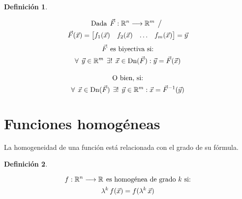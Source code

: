 \documentclass[a5paper,12pt,twoside]{book}
\newtheorem{defn}{{Definición}}[chapter]
\begin{document}
\begin{mdframed}[style=DefinitionFrame]
    \begin{defn}
    \end{defn}
    \begin{multline*}
        \textrm{Dada} \hspace{1ex} \Vec{F}: \mathbb{R}^n \longrightarrow \mathbb{R}^m \hspace{1ex} \big/ \hspace{1ex}
        \\
        \Vec{F}(\Vec{x}) = \begin{bmatrix} f_1(\Vec{x}) & f_2(\Vec{x}) & \ldots & f_m(\Vec{x}) \end{bmatrix} = \Vec{y}
    \end{multline*}
    \begin{gather*}
        \Vec{F} \hspace{1ex} \textrm{es biyectiva si:}
        \\
        \forall \hspace{1ex} \Vec{y} \in \mathbb{R}^m \hspace{1ex} \exists ! \hspace{1ex} \Vec{x} \in \operatorname{Dn}(\Vec{F}): \Vec{y} = \Vec{F}(\Vec{x})
        \\[1em]
        \textrm{O bien, si:}
        \\
        \forall \hspace{1ex} \Vec{x} \in \operatorname{Dn}(\Vec{F}) \hspace{1ex} \exists ! \hspace{1ex} \Vec{y} \in \mathbb{R}^m : \Vec{x} = \Vec{F}^{-1}(\Vec{y})
    \end{gather*}
\end{mdframed}


\section{Funciones homogéneas}

La homogeneidad de una función está relacionada con el grado de su fórmula.

\begin{mdframed}[style=DefinitionFrame]
    \begin{defn}
    \end{defn}
    \begin{gather*}
        f:\mathbb{R}^n \longrightarrow \mathbb{R} \hspace{1ex} \textrm{es homogénea de grado $k$ si:}
        \\
        \lambda^k \, f(\Vec{x}) = f(\lambda^k \, \Vec{x})
    \end{gather*}
\end{mdframed}
\end{document}
